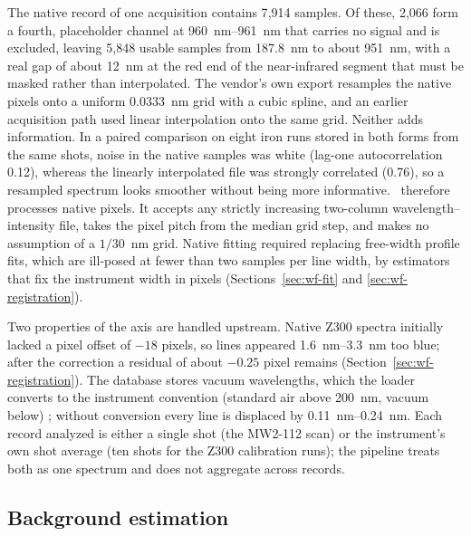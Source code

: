 The native record of one acquisition contains 7{,}914 samples.
Of these, 2{,}066 form a fourth, placeholder channel at \SIrange{960}{961}{nm} that carries
no signal and is excluded, leaving 5{,}848 usable samples from \SI{187.8}{nm} to about
\SI{951}{nm}, with a real gap of about \SI{12}{nm} at the red end of the near-infrared
segment that must be masked rather than interpolated.
The vendor's own export resamples the native pixels onto a uniform
\SI{0.0333}{nm} grid with a cubic spline, and an earlier acquisition path used linear
interpolation onto the same grid.
Neither adds information.
In a paired comparison on eight iron runs stored in both forms from the same shots, noise in
the native samples was white (lag-one autocorrelation 0.12), whereas the linearly
interpolated file was strongly correlated (0.76), so a resampled spectrum looks smoother
without being more informative.
\alibz\ therefore processes native pixels.
It accepts any strictly increasing two-column wavelength--intensity file, takes the
pixel pitch from the median grid step, and makes no assumption of a $1/30$~nm grid.
Native fitting required replacing free-width profile fits, which are ill-posed at fewer than
two samples per line width, by estimators that fix the instrument width in pixels
(Sections~\ref{sec:wf-fit} and \ref{sec:wf-registration}).

Two properties of the axis are handled upstream.
Native Z300 spectra initially lacked a pixel offset of $-18$ pixels, so lines appeared \SIrange{1.6}{3.3}{nm} too blue; after the correction a residual of about $-0.25$ pixel remains (Section~\ref{sec:wf-registration}).
The database stores vacuum wavelengths, which the loader converts to the instrument convention (standard air above \SI{200}{nm}, vacuum below) \citep{edlen1966refractive,ciddor1996refractive}; without conversion every line is displaced by \SIrange{0.11}{0.24}{nm}. %
Each record analyzed is either a single shot (the MW2-112 scan) or the instrument's own
shot average (ten shots for the Z300 calibration runs); the pipeline treats both as one
spectrum and does not aggregate across records.

\subsection{Background estimation}
\label{sec:wf-background}

